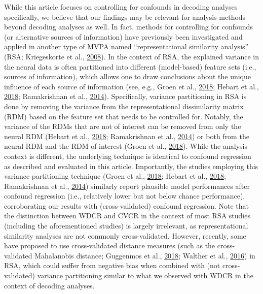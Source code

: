 \documentclass[12pt,american,a4paper,oneside,]{memoir} %
\begin{document}
While this article focuses on controlling for confounds in decoding analyses specifically, we believe that our findings may be relevant for analysis methods beyond decoding analyses as well. In fact, methods for controlling for confounds (or alternative sources of information) have previously been investigated and applied in another type of MVPA named ``representational similarity analysis'' (RSA; Kriegeskorte et al., \protect\hyperlink{ref-kriegeskorte2008representational}{2008}). In the context of RSA, the explained variance in the neural data is often partitioned into different (model-based) feature sets (i.e., sources of information), which allows one to draw conclusions about the unique influence of each source of information (see, e.g., Groen et al., \protect\hyperlink{ref-Groen2018-qo}{2018}; Hebart et al., \protect\hyperlink{ref-Hebart2018-dz}{2018}; Ramakrishnan et al., \protect\hyperlink{ref-Ramakrishnan2014-ki}{2014}). Specifically, variance partitioning in RSA is done by removing the variance from the representational dissimilarity matrix (RDM) based on the feature set that needs to be controlled for. Notably, the variance of the RDMs that are not of interest can be removed from only the neural RDM (Hebart et al., \protect\hyperlink{ref-Hebart2018-dz}{2018}; Ramakrishnan et al., \protect\hyperlink{ref-Ramakrishnan2014-ki}{2014}) or both from the neural RDM and the RDM of interest (Groen et al., \protect\hyperlink{ref-Groen2018-qo}{2018}). While the analysis context is different, the underlying technique is identical to confound regression as described and evaluated in this article. Importantly, the studies employing this variance partitioning technique (Groen et al., \protect\hyperlink{ref-Groen2018-qo}{2018}; Hebart et al., \protect\hyperlink{ref-Hebart2018-dz}{2018}; Ramakrishnan et al., \protect\hyperlink{ref-Ramakrishnan2014-ki}{2014}) similarly report plausible model performances after confound regression (i.e., relatively lower but not below chance performance), corroborating our results with (cross-validated) confound regression. Note that the distinction between WDCR and CVCR in the context of most RSA studies (including the aforementioned studies) is largely irrelevant, as representational similarity analyses are not commonly cross-validated. However, recently, some have proposed to use cross-validated distance measures (such as the cross-validated Mahalanobis distance; Guggenmos et al., \protect\hyperlink{ref-Guggenmos2018-rr}{2018}; Walther et al., \protect\hyperlink{ref-Walther2016-je}{2016}) in RSA, which could suffer from negative bias when combined with (not cross-validated) variance partitioning similar to what we observed with WDCR in the context of decoding analyses.
\end{document}
